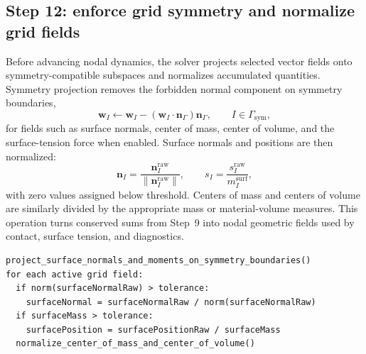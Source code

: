 \subsection{Step 12: enforce grid symmetry and normalize grid fields}
\label{subsec:solver-step-12}
Before advancing nodal dynamics, the solver projects selected vector fields onto symmetry-compatible subspaces and normalizes accumulated quantities.  Symmetry projection removes the forbidden normal component on symmetry boundaries,
\begin{equation}
  \mathbf{w}_I \leftarrow \mathbf{w}_I - (\mathbf{w}_I\cdot\mathbf{n}_{\Gamma})\mathbf{n}_{\Gamma},
  \qquad I\in\Gamma_{\mathrm{sym}},
\end{equation}
for fields such as surface normals, center of mass, center of volume, and the surface-tension force when enabled.  Surface normals and positions are then normalized:
\begin{equation}
  \mathbf{n}_I = \frac{\mathbf{n}^{\mathrm{raw}}_I}{\|\mathbf{n}^{\mathrm{raw}}_I\|},
  \qquad
  s_I = \frac{s^{\mathrm{raw}}_I}{m^{\mathrm{surf}}_I},
\end{equation}
with zero values assigned below threshold.  Centers of mass and centers of volume are similarly divided by the appropriate mass or material-volume measures.  This operation turns conserved sums from Step~9 into nodal geometric fields used by contact, surface tension, and diagnostics.

\begin{lstlisting}[caption={Symmetry projection and normalization.},basicstyle=\ttfamily\small]
project_surface_normals_and_moments_on_symmetry_boundaries()
for each active grid field:
  if norm(surfaceNormalRaw) > tolerance:
    surfaceNormal = surfaceNormalRaw / norm(surfaceNormalRaw)
  if surfaceMass > tolerance:
    surfacePosition = surfacePositionRaw / surfaceMass
  normalize_center_of_mass_and_center_of_volume()
\end{lstlisting}

